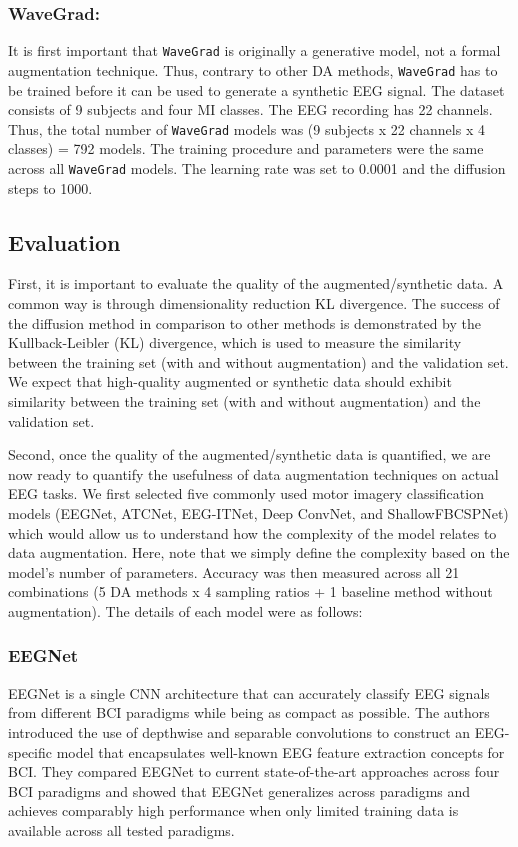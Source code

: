 \subsubsection{WaveGrad:}
It is first important that \texttt{WaveGrad} is originally a generative model, not a formal augmentation technique.
Thus, contrary to other DA methods, \texttt{WaveGrad} has to be trained before it can be used to generate a synthetic EEG signal.
The dataset consists of 9 subjects and four MI classes.
The EEG recording has 22 channels.
Thus, the total number of \texttt{WaveGrad} models was (9 subjects x 22 channels x 4 classes) = 792 models.
The training procedure and parameters were the same across all \texttt{WaveGrad} models.
The learning rate was set to 0.0001 and the diffusion steps to 1000.

\subsection{Evaluation}
First, it is important to evaluate the quality of the augmented/synthetic data.
A common way is through dimensionality reduction KL divergence.
The success of the diffusion method in comparison to other methods is demonstrated by the Kullback-Leibler (KL) divergence, which is used to measure the similarity between the training set (with and without augmentation) and the validation set.
We expect that high-quality augmented or synthetic data should exhibit similarity between the training set (with and without augmentation) and the validation set.

Second, once the quality of the augmented/synthetic data is quantified, we are now ready to quantify the usefulness of data augmentation techniques on actual EEG tasks.
We first selected five commonly used motor imagery classification models (EEGNet, ATCNet, EEG-ITNet, Deep ConvNet, and ShallowFBCSPNet) which would allow us to understand how the complexity of the model relates to data augmentation.
Here, note that we simply define the complexity based on the model's number of parameters.
Accuracy was then measured across all 21 combinations (5 DA methods x 4 sampling ratios + 1 baseline method without augmentation).
The details of each model were as follows:

\subsubsection{EEGNet}
EEGNet is a single CNN architecture that can accurately classify EEG signals from different BCI paradigms while being as compact as possible.
The authors introduced the use of depthwise and separable convolutions to construct an EEG-specific model that encapsulates well-known EEG feature extraction concepts for BCI.
They compared EEGNet to current state-of-the-art approaches across four BCI paradigms and showed that EEGNet generalizes across paradigms and achieves comparably high performance when only limited training data is available across all tested paradigms.

